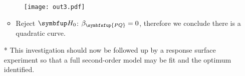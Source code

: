 \begin{itemize}
            \begin{figure}[!htbp]
                  \centering
                  \texttt{[image: out3.pdf]}
                  \caption{}\label{fig:netflixout3}
            \end{figure}
            \begin{itemize}
                  \item Reject $ \HN $: $ \beta_{\symbfsfup{PQ}}=0 $, therefore we conclude there is a quadratic curve.
            \end{itemize}
      \item[*] This investigation should now be followed up by a response surface experiment so that a full second-order model may be fit and the optimum identified.
\end{itemize}
